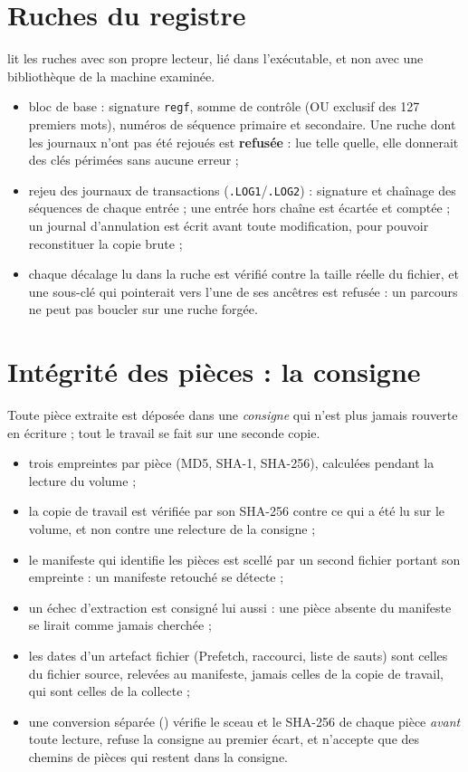 \documentclass[11pt,a4paper,oneside]{report}
\begin{document}
\section{Ruches du registre}

\wac{} lit les ruches avec son propre lecteur, lié dans l'exécutable, et non
avec une bibliothèque de la machine examinée.

\begin{itemize}
  \item bloc de base : signature \texttt{regf}, somme de contrôle (OU exclusif
    des 127 premiers mots), numéros de séquence primaire et secondaire. Une
    ruche dont les journaux n'ont pas été rejoués est \textbf{refusée} : lue
    telle quelle, elle donnerait des clés périmées sans aucune erreur ;
  \item rejeu des journaux de transactions (\texttt{.LOG1}/\texttt{.LOG2}) :
    signature et chaînage des séquences de chaque entrée ; une entrée hors
    chaîne est écartée et comptée ; un journal d'annulation est écrit avant
    toute modification, pour pouvoir reconstituer la copie brute ;
  \item chaque décalage lu dans la ruche est vérifié contre la taille réelle du
    fichier, et une sous-clé qui pointerait vers l'une de ses ancêtres est
    refusée : un parcours ne peut pas boucler sur une ruche forgée.
\end{itemize}

\section{Intégrité des pièces : la consigne}

Toute pièce extraite est déposée dans une \emph{consigne} qui n'est plus jamais
rouverte en écriture ; tout le travail se fait sur une seconde copie.

\begin{itemize}
  \item trois empreintes par pièce (MD5, SHA-1, SHA-256), calculées pendant la
    lecture du volume ;
  \item la copie de travail est vérifiée par son SHA-256 contre ce qui a été
    lu sur le volume, et non contre une relecture de la consigne ;
  \item le manifeste qui identifie les pièces est scellé par un second fichier
    portant son empreinte : un manifeste retouché se détecte ;
  \item un échec d'extraction est consigné lui aussi : une pièce absente du
    manifeste se lirait comme jamais cherchée ;
  \item les dates d'un artefact fichier (Prefetch, raccourci, liste de sauts)
    sont celles du fichier source, relevées au manifeste, jamais celles de la
    copie de travail, qui sont celles de la collecte ;
  \item une conversion séparée () vérifie le sceau et le
    SHA-256 de chaque pièce \emph{avant} toute lecture, refuse la consigne au
    premier écart, et n'accepte que des chemins de pièces qui restent dans la
    consigne.
\end{itemize}
\end{document}
